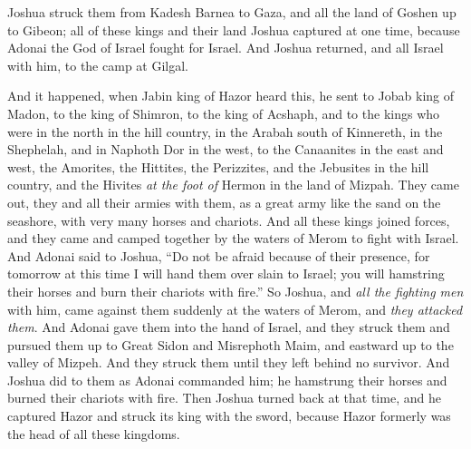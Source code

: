 \begin{biblechapter}
\verse Joshua struck them from Kadesh Barnea to Gaza, and all the land of Goshen up to Gibeon;
\verse all of these kings and their land Joshua captured at one time, because Adonai the God of Israel fought for Israel.
\verse And Joshua returned, and all Israel with him, to the camp at Gilgal.
\end{biblechapter}

\begin{biblechapter} %
 And it happened, when Jabin king of Hazor heard this, he sent to Jobab king of Madon, to the king of Shimron, to the king of Acshaph,
\verse and to the kings who were in the north in the hill country, in the Arabah south of Kinnereth, in the Shephelah, and in Naphoth Dor in the west,
\verse to the Canaanites in the east and west, the Amorites, the Hittites, the Perizzites, and the Jebusites in the hill country, and the Hivites \textit{at the foot of} Hermon in the land of Mizpah.
\verse They came out, they and all their armies with them, as a great army like the sand on the seashore, with very many horses and chariots.
\verse And all these kings joined forces, and they came and camped together by the waters of Merom to fight with Israel.
\verse And Adonai said to Joshua, “Do not be afraid because of their presence, for tomorrow at this time I will hand them over slain to Israel; you will hamstring their horses and burn their chariots with fire.”
\verse So Joshua, and \textit{all the fighting men} with him, came against them suddenly at the waters of Merom, and \textit{they attacked them}.
\verse And Adonai gave them into the hand of Israel, and they struck them and pursued them up to Great Sidon and Misrephoth Maim, and eastward up to the valley of Mizpeh. And they struck them until they left behind no survivor.
\verse And Joshua did to them as Adonai commanded him; he hamstrung their horses and burned their chariots with fire.
\verse Then Joshua turned back at that time, and he captured Hazor and struck its king with the sword, because Hazor formerly was the head of all these kingdoms.

\end{biblechapter}
